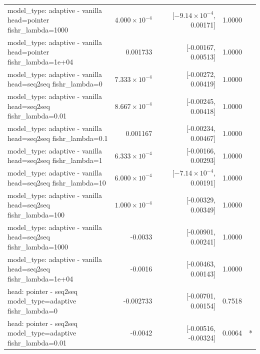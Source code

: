 \documentclass[10pt]{article}
\makeatletter
\newcommand{\stackcell}[1]{\begin{tabular}[t]{@{}l@{}}#1\end{tabular}}
\makeatother
\begin{document}
{\begin{longtable}{lrrrl}
\stackcell{model\_type: adaptive - vanilla\\\footnotesize head=pointer fishr\_lambda=1000 } & $4.000\times10^{-4}$ & [$-9.14\times10^{-4}$, 0.00171] & 1.0000 & \\
\stackcell{model\_type: adaptive - vanilla\\\footnotesize head=pointer fishr\_lambda=1e+04 } & 0.001733 & [-0.00167, 0.00513] & 1.0000 & \\
\stackcell{model\_type: adaptive - vanilla\\\footnotesize head=seq2seq fishr\_lambda=0 } & $7.333\times10^{-4}$ & [-0.00272, 0.00419] & 1.0000 & \\
\stackcell{model\_type: adaptive - vanilla\\\footnotesize head=seq2seq fishr\_lambda=0.01 } & $8.667\times10^{-4}$ & [-0.00245, 0.00418] & 1.0000 & \\
\stackcell{model\_type: adaptive - vanilla\\\footnotesize head=seq2seq fishr\_lambda=0.1 } & 0.001167 & [-0.00234, 0.00467] & 1.0000 & \\
\stackcell{model\_type: adaptive - vanilla\\\footnotesize head=seq2seq fishr\_lambda=1 } & $6.333\times10^{-4}$ & [-0.00166, 0.00293] & 1.0000 & \\
\stackcell{model\_type: adaptive - vanilla\\\footnotesize head=seq2seq fishr\_lambda=10 } & $6.000\times10^{-4}$ & [$-7.14\times10^{-4}$, 0.00191] & 1.0000 & \\
\stackcell{model\_type: adaptive - vanilla\\\footnotesize head=seq2seq fishr\_lambda=100 } & $1.000\times10^{-4}$ & [-0.00329, 0.00349] & 1.0000 & \\
\stackcell{model\_type: adaptive - vanilla\\\footnotesize head=seq2seq fishr\_lambda=1000 } & -0.0033 & [-0.00901, 0.00241] & 1.0000 & \\
\stackcell{model\_type: adaptive - vanilla\\\footnotesize head=seq2seq fishr\_lambda=1e+04 } & -0.0016 & [-0.00463, 0.00143] & 1.0000 & \\
\stackcell{head: pointer - seq2seq\\\footnotesize model\_type=adaptive fishr\_lambda=0 } & -0.002733 & [-0.00701, 0.00154] & 0.7518 & \\
\stackcell{head: pointer - seq2seq\\\footnotesize model\_type=adaptive fishr\_lambda=0.01 } & -0.0042 & [-0.00516, -0.00324] & 0.0064 & *\\

\end{longtable}}
\end{document}
